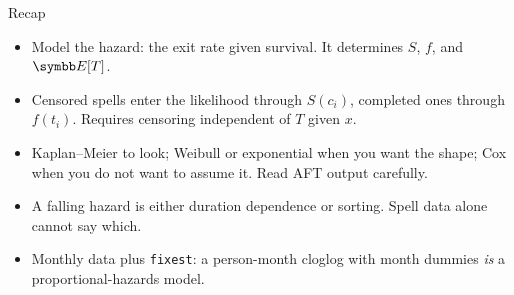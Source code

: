 \documentclass[aspectratio=169,11pt]{beamer}
\begin{document}
\begin{frame}{Recap}
\begin{itemize}
	\item Model the \alert{hazard}: the exit rate given survival. It determines $S$, $f$, and $\E[T]$.
	\medskip
	\item Censored spells enter the likelihood through $S(c_i)$, completed ones through $f(t_i)$.
	Requires censoring independent of $T$ given $x$.
	\medskip
	\item Kaplan--Meier to look; Weibull or exponential when you want the shape; Cox when you do not
	want to assume it. Read AFT output carefully.
	\medskip
	\item A falling hazard is either duration dependence or sorting. Spell data alone cannot say which.
	\medskip
	\item Monthly data plus \texttt{fixest}: a person-month cloglog with month dummies \emph{is} a
	proportional-hazards model.
\end{itemize}
\end{frame}
\end{document}
